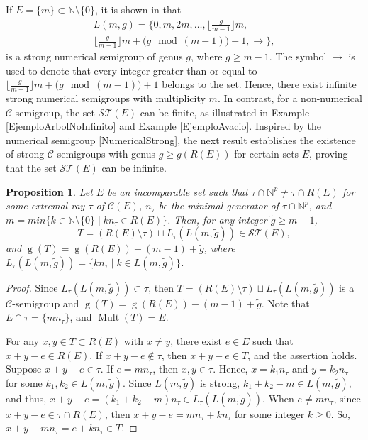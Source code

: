 \documentclass[a4paper,11pt]{article}
\newtheorem{proposition}[theorem]{Proposition}
\def\CaC{\mathcal{C}}
\def\N{\mathbb{N}}
\def\g{\operatorname{g}}
\def\Mult{\operatorname{Mult}}
\begin{document}
{If $E=\{m\}\subset \N\setminus\{ 0\}$,  it is shown in \cite{Strong nuevo de JC} that
\begin{multline}\label{NumericalStrong}
L(m,g)=\Big\{0,m,2m, \ldots ,\Big\lfloor \frac{g}{m-1} \Big\rfloor m,\\ \Big\lfloor \frac{g}{m-1} \Big\rfloor m+\big(g\mod (m-1)\big)+1,\to  \Big\},
\end{multline}
is a strong numerical semigroup of genus $g$, where $g\geq m-1$. The symbol $\to$ is used to denote that every integer greater than or equal to $\Big\lfloor \frac{g}{m-1} \Big\rfloor m+\big(g\mod (m-1)\big)+1$ belongs to the set. Hence, there exist infinite strong numerical semigroups with multiplicity $m$.
In contrast, for a non-numerical $\CaC$-semigroup, the set $\mathcal{ST}(E)$ can be finite, as illustrated in Example \ref{EjemploArbolNoInfinito} and Example \ref{EjemploAvacio}.
Inspired by the numerical semigroup \eqref{NumericalStrong}, the next result establishes the existence of strong $\CaC$-semigroups with genus $g \geq g(R(E))$ for certain sets $E$, proving that the set $\mathcal{ST}(E)$ can be infinite.

\begin{proposition}\label{EconAlgunRayoNoCompleto}
Let $E$ be an incomparable set such that $\tau\cap \N^p\neq \tau\cap R(E)$ for some extremal ray $\tau$ of $\CaC(E)$, $n_\tau$ be the minimal generator of $\tau\cap \N^p$, and  $m=min\{k\in\N\setminus\{0\}\mid kn_\tau\in R(E)\}$. Then, for any integer $\tilde{g}\ge m-1$,
\[
T=(R(E)\setminus \tau) \sqcup L_\tau(L(m,\tilde{g}))\in \mathcal{ST}(E),
\]
and $\g(T)=\g(R(E))-(m-1)+\tilde{g}$, where $L_\tau(L(m,\tilde{g}))=\{kn_\tau\mid k\in L(m,\tilde{g})\}$.
\end{proposition}

\begin{proof}
Since $L_\tau(L(m,\tilde{g}))\subset \tau$, then $T=(R(E)\setminus \tau) \sqcup L_\tau(L(m,\tilde{g}))$ is a $\CaC$-semigroup and $\g (T)=\g(R(E))-(m-1)+\tilde{g}$. Note that $E\cap \tau=\{mn_\tau\}$, and $\Mult(T)=E$.

For any $x,y\in T\subset R(E)$ with $x\neq y$, there exist $e\in E$ such that $x+y-e\in R(E)$. If $x+y-e\notin \tau$, then $x+y-e\in T$, and the assertion holds.
Suppose $x+y-e\in \tau$. If $e=m n_\tau$, then $x,y\in \tau$. Hence, $x=k_1 n_\tau$ and $y=k_2 n_\tau$ for some $k_1,k_2\in L(m,\tilde{g})$. Since $L(m,\tilde{g})$ is strong, $k_1+k_2-m\in L(m,\tilde{g})$, and thus,  $x+y-e=(k_1+k_2-m)n_\tau\in L_\tau(L(m,\tilde{g}))$. When $e\neq m n_\tau$, since $x+y-e\in \tau\cap R(E)$, then $x+y-e=mn_\tau+kn_\tau$ for some integer $k\ge 0$. So, $x+y-mn_\tau=e+kn_\tau\in T$.
\end{proof}

}
\end{document}
